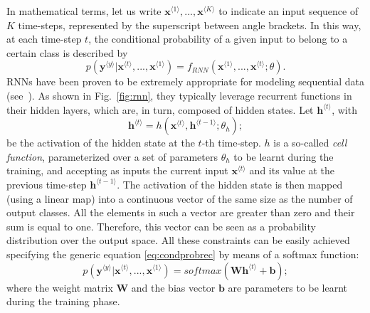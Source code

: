 In mathematical terms, let us write
$\mathbf{x}^{\langle 1 \rangle}, ..., \mathbf{x}^{\langle K \rangle}$
to indicate an input sequence of $K$ time-steps, represented by the
superscript between angle brackets. In this way, at each time-step $t$,
the conditional probability of a given input to belong to a certain class is described by
%
\begin{equation}
\label{eq:condprobrec}
  p(\mathbf{y}^{\langle y \rangle}|\mathbf{x}^{\langle t \rangle}, ..., \mathbf{x}^{\langle 1 \rangle}) = f_{\mathit{RNN}}(\mathbf{x}^{\langle 1 \rangle}, ..., \mathbf{x}^{\langle t \rangle}; \theta).
\end{equation}
%
RNNs have been proven to be extremely appropriate for modeling sequential
data (see~\cite{goodfellow2016dlbook}). As shown in Fig.~\ref{fig:rnn}, they typically leverage
recurrent functions in their hidden layers, which are, in turn, composed of hidden states. Let
$\mathbf{h}^{\langle t \rangle}$, with
\begin{equation}
  \label{eq:hidden}
  \mathbf{h}^{\langle t \rangle} = h(\mathbf{x}^{\langle t \rangle}, \mathbf{h}^{\langle t-1 \rangle}; \theta_{h});
\end{equation}
be the activation of the hidden state at the $t$-th time-step. $h$ is a so-called \emph{cell function}, parameterized over a set
of parameters $\theta_{h}$ to be learnt during the training, and accepting as inputs the current input $\mathbf{x}^{\langle t \rangle}$ and its value at the
previous time-step $\mathbf{h}^{\langle t-1 \rangle}$.
The activation of the hidden state is then mapped (using a linear map) into a continuous vector of the
same size as the number of output classes. All the elements in such a vector are greater than zero and their sum is equal to one. Therefore, this vector can be seen as a probability distribution over the output space.
All these constraints can be easily achieved specifying the generic equation \eqref{eq:condprobrec} by means of a softmax function:
%
\begin{equation}
  \label{eq:softmax}
  p(\mathbf{y}^{\langle y \rangle}|\mathbf{x}^{\langle t \rangle}, ..., \mathbf{x}^{\langle 1 \rangle}) =
  softmax(\mathbf{W}\mathbf{h}^{\langle t \rangle} + \mathbf{b});
\end{equation}
%
where the weight matrix $\mathbf{W}$ and the bias vector $\mathbf{b}$
are parameters to be learnt during the training phase.

